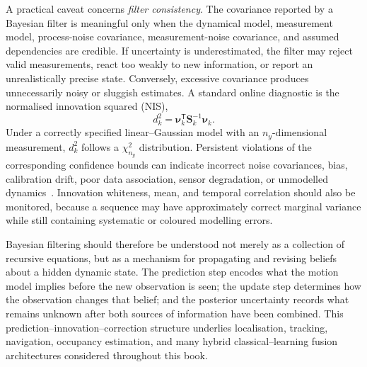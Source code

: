 \documentclass[11pt,oneside,openany]{book}
\newcommand{\addednew}[1]{\textcolor{RevisionOlive}{#1}}
\begin{document}

A practical caveat concerns \emph{filter consistency}. The covariance
reported by a Bayesian filter is meaningful only when the dynamical
model, measurement model, process-noise covariance, measurement-noise
covariance, and assumed dependencies are credible. If uncertainty is
underestimated, the filter may reject valid measurements, react too
weakly to new information, or report an unrealistically precise state.
Conversely, excessive covariance produces unnecessarily noisy or
sluggish estimates. A standard online diagnostic is the normalised
innovation squared (NIS),
\begin{equation}
d^2_k
=
\boldsymbol{\nu}_k^{\mathsf T}
\mathbf{S}_k^{-1}
\boldsymbol{\nu}_k.
\label{eq:nis}
\end{equation}
Under a correctly specified linear--Gaussian model with an
$n_y$-dimensional measurement, $d^2_k$ follows a
$\chi^2_{n_y}$ distribution. Persistent violations of the corresponding
confidence bounds can indicate incorrect noise covariances, bias,
calibration drift, poor data association, sensor degradation, or
unmodelled dynamics~\cite{barshalom2001_estimation}. Innovation
whiteness, mean, and temporal correlation should also be monitored,
because a sequence may have approximately correct marginal variance
while still containing systematic or coloured modelling errors.

Bayesian filtering should therefore be understood not merely as a collection of recursive equations, but as a mechanism for propagating and revising beliefs about a hidden dynamic state. The prediction step encodes what the motion model implies before the new observation is seen; the update step determines how the observation changes that belief; and the posterior uncertainty records what remains unknown after both sources of information have been combined. This prediction--innovation--correction structure underlies localisation, tracking, navigation, occupancy estimation, and many hybrid classical--learning fusion architectures considered throughout this book.
\end{document}
